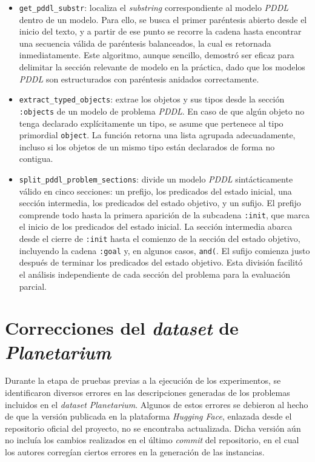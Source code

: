 \begin{itemize}

    \item \texttt{get\_pddl\_substr}: localiza el \textit{substring} correspondiente al modelo \textit{PDDL} dentro de un modelo. Para ello, se busca el primer paréntesis abierto desde el inicio del texto, y a partir de ese punto se recorre la cadena hasta encontrar una secuencia válida de paréntesis balanceados, la cual es retornada inmediatamente. Este algoritmo, aunque sencillo, demostró ser eficaz para delimitar la sección relevante de modelo en la práctica, dado que los modelos \textit{PDDL} son estructurados con paréntesis anidados correctamente.

    \item \texttt{extract\_typed\_objects}: extrae los objetos y sus tipos desde la sección \texttt{:objects} de un modelo de problema \textit{PDDL}. En caso de que algún objeto no tenga declarado explícitamente un tipo, se asume que pertenece al tipo primordial \texttt{object}. La función retorna una lista agrupada adecuadamente, incluso si los objetos de un mismo tipo están declarados de forma no contigua.

    \item \texttt{split\_pddl\_problem\_sections}: divide un modelo \textit{PDDL} sintácticamente válido en cinco secciones: un prefijo, los predicados del estado inicial, una sección intermedia, los predicados del estado objetivo, y un sufijo. El prefijo comprende todo hasta la primera aparición de la subcadena \texttt{:init}, que marca el inicio de los predicados del estado inicial. La sección intermedia abarca desde el cierre de \texttt{:init} hasta el comienzo de la sección del estado objetivo, incluyendo la cadena \texttt{:goal} y, en algunos casos, \texttt{and(}. El sufijo comienza justo después de terminar los predicados del estado objetivo. Esta división facilitó el análisis independiente de cada sección del problema para la evaluación parcial.

\end{itemize}

\section{Correcciones del \textit{dataset} de \textit{Planetarium}}

Durante la etapa de pruebas previas a la ejecución de los experimentos, se identificaron diversos errores en las descripciones generadas de los problemas incluidos en el \textit{dataset Planetarium}. Algunos de estos errores se debieron al hecho de que la versión publicada en la plataforma \textit{Hugging Face}, enlazada desde el repositorio oficial del proyecto, no se encontraba actualizada. Dicha versión aún no incluía los cambios realizados en el último \textit{commit} del repositorio, en el cual los autores corregían ciertos errores en la generación de las instancias.

